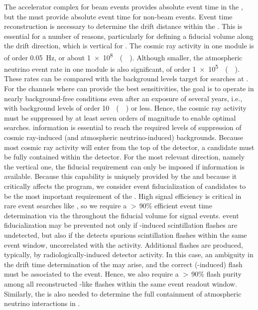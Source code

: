 The accelerator complex for beam events provides absolute event time in the \dune {}, but the  must provide absolute event time for non-beam events. Event time reconstruction is necessary to determine the drift distance within the . This is essential for a number of reasons, particularly for defining a fiducial volume along the  drift direction, which is  vertical  for . The cosmic ray activity in one  module is of order \SI{0.05}{\Hz}, or about \SI{1e8}{\per(\Mtyr)}. Although smaller, the atmospheric neutrino event rate in one  module is also significant, of order \SI{1e5}{\per(\Mtyr)}. These rates can be compared with the background levels target for  searches at \dune. For the  channels where \dune can provide the best sensitivities, the goal is to operate in nearly background-free conditions even after an exposure of several years, i.e., with background levels of order \SI{10}{\per(\Mtyr)} or less. Hence, the cosmic ray activity must be suppressed by at least seven orders of magnitude to enable optimal  searches.  information is essential to reach the required levels of suppression of cosmic ray-induced (and atmospheric neutrino-induced) backgrounds. 
%
Because most cosmic ray activity will enter from the top of the detector, a  candidate must be fully contained within the detector. For the most relevant direction, namely the vertical one, the fiducial requirement can only be imposed if  information is available. Because this capability is uniquely provided by the  and because it critically affects the  program,  we consider event fiducialization of  candidates to be the most important requirement of the . High signal efficiency is critical in rare event searches like , so  we require a $>\,$90\% efficient event time determination via the  throughout the  fiducial volume for  signal events.  event fiducialization may be prevented not only if -induced  scintillation flashes are undetected, but also if the  detects spurious  scintillation flashes within the same event window, uncorrelated with the  activity. Additional flashes are produced, typically, by radiologically-induced detector activity. In this case, an ambiguity in the drift time determination of the  may arise, and the correct (-induced) flash must be associated to the event. Hence, we also require a $>\,$90\%  flash purity among all reconstructed -like flashes within the same  event readout window. Similarly, the  is also needed to determine the full containment of atmospheric neutrino interactions in \dune.
 
